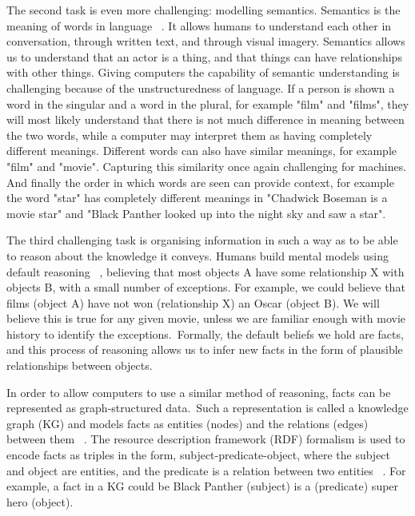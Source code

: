 \noindent The second task is even more challenging: modelling semantics. Semantics is the meaning of words in language \unskip~\citep{chomsky1955logical}. It allows humans to understand each other in conversation, through written text, and through visual imagery. Semantics allows us to understand that an actor is a thing, and that things can have relationships with other things. Giving computers the capability of semantic understanding is challenging because of the unstructuredness of language. If a person is shown a word in the singular and a word in the plural, for example "film" and "films", they will most likely understand that there is not much difference in meaning between the two words, while a computer may interpret them as having completely different meanings. Different words can also have similar meanings, for example "film" and "movie". Capturing this similarity once again challenging for machines. And finally the order in which words are seen can provide context, for example the word "star" has completely different meanings in "Chadwick Boseman is a movie star" and "Black Panther looked up into the night sky and saw a star". \par

\noindent The third challenging task is organising information in such a way as to be able to reason about the knowledge it conveys. Humans build mental models using default reasoning \unskip~\citep{reiter1980logic}, believing that most objects A have some relationship X with objects B, with a small number of exceptions. For example, we could believe that films (object A) have not won (relationship X) an Oscar (object B). We will believe this is true for any given movie, unless we are familiar enough with movie history to identify the exceptions.\ Formally, the default beliefs we hold are facts, and this process of reasoning allows us to infer new facts in the form of plausible relationships between objects. \par

\noindent In order to allow computers to use a similar method of reasoning, facts can be represented as graph-structured data.\ Such a representation is called a knowledge graph (KG) and models facts as entities (nodes) and the relations (edges) between them \unskip~\citep{Nickel_2016}. The resource description framework (RDF) formalism is used to encode facts as triples in the form, subject-predicate-object, where the subject and object are entities, and the predicate is a relation between two entities \unskip~\citep{bizer2009dbpedia}. For example, a fact in a KG could be Black Panther (subject) is a (predicate) super hero (object). \par

